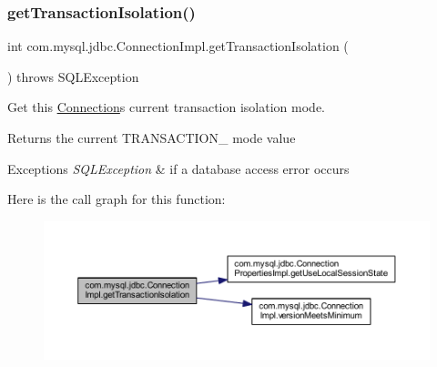 \mbox{\label{classcom_1_1mysql_1_1jdbc_1_1_connection_impl_a81ce78e20924c6a752125f2357caa2f3}} 
\subsubsection{\texorpdfstring{get\+Transaction\+Isolation()}{getTransactionIsolation()}}
{\footnotesize\ttfamily int com.\+mysql.\+jdbc.\+Connection\+Impl.\+get\+Transaction\+Isolation (\begin{DoxyParamCaption}{ }\end{DoxyParamCaption}) throws S\+Q\+L\+Exception}

Get this \mbox{\hyperlink{interfacecom_1_1mysql_1_1jdbc_1_1_connection}{Connection}}\textquotesingle{}s current transaction isolation mode.

\begin{DoxyReturn}{Returns}
the current T\+R\+A\+N\+S\+A\+C\+T\+I\+O\+N\+\_\+ mode value 
\end{DoxyReturn}

\begin{DoxyExceptions}{Exceptions}
{\em S\+Q\+L\+Exception} & if a database access error occurs \\
\hline
\end{DoxyExceptions}
Here is the call graph for this function\+:\nopagebreak
\begin{figure}[H]
\begin{center}
\leavevmode
\includegraphics[width=350pt]{classcom_1_1mysql_1_1jdbc_1_1_connection_impl_a81ce78e20924c6a752125f2357caa2f3_cgraph}
\end{center}
\end{figure}
\mbox{\label{classcom_1_1mysql_1_1jdbc_1_1_connection_impl_ace53cfdc1eb07ad6be41058bc4cb4918}} 

